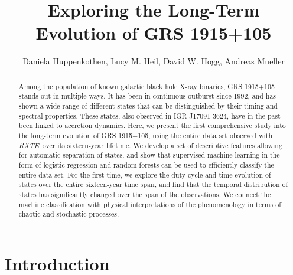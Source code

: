 \documentclass[12pt]{emulateapj}
\newcommand{\project}[1]{\textsl{#1}}
\newcommand{\rxte}{\project{RXTE}}
\begin{document}
\title{Exploring the Long-Term Evolution of GRS 1915+105}

\author{Daniela Huppenkothen, Lucy M. Heil, David W. Hogg, Andreas Mueller}
 

\begin{abstract}
Among the population of known galactic black hole X-ray binaries, GRS 1915+105 stands out in multiple ways. It has been in continuous outburst since 1992, and has shown a wide range of different states that can be distinguished by their timing and spectral properties. These states, also observed in IGR J17091-3624, have in the past been linked to accretion dynamics. %
Here, we present the first comprehensive study into the long-term evolution of GRS 1915+105, using the entire data set observed with \rxte\ over its sixteen-year lifetime. We develop a set of descriptive features allowing for automatic separation of states, and show that supervised machine learning in the form of logistic regression and random forests can be used to efficiently classify the entire data set. For the first time, we explore the duty cycle and time evolution of states over the entire sixteen-year time span, and find that the temporal distribution of states has significantly changed over the span of the observations. We connect the machine classification with physical interpretations of the phenomenology in terms of chaotic and stochastic processes.
\end{abstract}


\section{Introduction}
\end{document}

